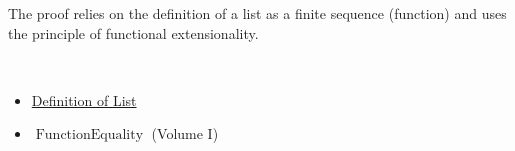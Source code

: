 \begin{remark*}
The proof relies on the definition of a list as a finite sequence (function) and uses the principle of functional extensionality.
\end{remark*}

\begin{remark*}[Dependencies]~\\
\begin{itemize}
  \item \hyperref[def:list]{Definition of List}
  \item $\operatorname{FunctionEquality}$ (Volume I)
\end{itemize}
\end{remark*}
